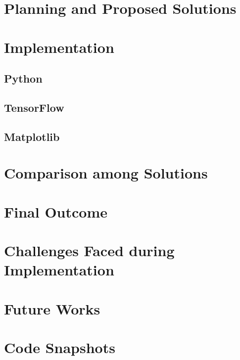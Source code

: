 \documentclass[preprint,12pt]{elsarticle}
\begin{document}
\section{Planning and Proposed Solutions}
\label{S:2}

\section{Implementation}
\label{S:3}
\subsection{Python}
\subsection{TensorFlow}
\subsection{Matplotlib}

\section{Comparison among Solutions}
\label{S:4}

\section{Final Outcome}
\label{S:5}

\section{Challenges Faced during Implementation}
\label{S:6}

\section{Future Works}
\label{S:7}

\section{Code Snapshots}
\label{S:8}


\end{document}
